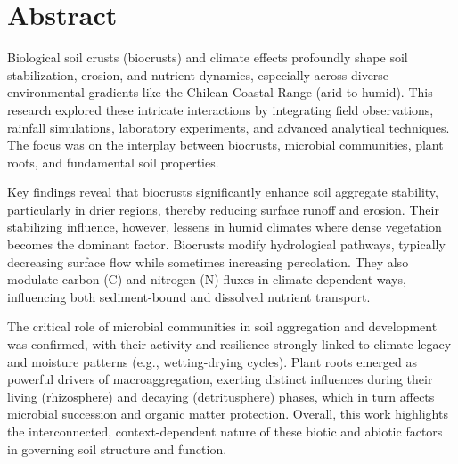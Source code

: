 \chapter*{Abstract}

Biological soil crusts (biocrusts) and climate effects profoundly shape soil stabilization, erosion, and nutrient dynamics, especially across diverse environmental gradients like the Chilean Coastal Range (arid to humid). This research explored these intricate interactions by integrating field observations, rainfall simulations, laboratory experiments, and advanced analytical techniques. The focus was on the interplay between biocrusts, microbial communities, plant roots, and fundamental soil properties.

Key findings reveal that biocrusts significantly enhance soil aggregate stability, particularly in drier regions, thereby reducing surface runoff and erosion. Their stabilizing influence, however, lessens in humid climates where dense vegetation becomes the dominant factor. Biocrusts modify hydrological pathways, typically decreasing surface flow while sometimes increasing percolation. They also modulate carbon (C) and nitrogen (N) fluxes in climate-dependent ways, influencing both sediment-bound and dissolved nutrient transport.

The critical role of microbial communities in soil aggregation and development was confirmed, with their activity and resilience strongly linked to climate legacy and moisture patterns (e.g., wetting-drying cycles). Plant roots emerged as powerful drivers of macroaggregation, exerting distinct influences during their living (rhizosphere) and decaying (detritusphere) phases, which in turn affects microbial succession and organic matter protection. Overall, this work highlights the interconnected, context-dependent nature of these biotic and abiotic factors in governing soil structure and function.

